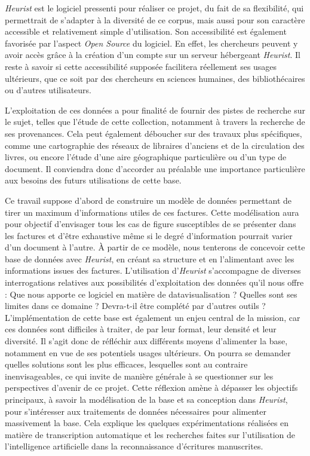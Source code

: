 \documentclass[12pt,twoside]{book}
\begin{document}
\emph{Heurist} est le logiciel pressenti pour réaliser ce projet, du fait de sa flexibilité, qui permettrait de s'adapter à la diversité de ce corpus, mais aussi pour son caractère accessible et relativement simple d'utilisation. 
Son accessibilité est également favorisée par l'aspect \emph{Open Source} du logiciel. En effet, les chercheurs peuvent y avoir accès grâce à la création d'un compte sur un serveur hébergeant \emph{Heurist}. Il reste à savoir si cette accessibilité supposée facilitera réellement ses usages ultérieurs, que ce soit par des chercheurs en sciences humaines, des bibliothécaires ou d'autres utilisateurs. 

L'exploitation de ces données a pour finalité de fournir des pistes de recherche sur le sujet, telles que l'étude de cette collection, notamment à travers la recherche de ses provenances. Cela peut également déboucher sur des travaux plus spécifiques, comme une cartographie des réseaux de libraires d'anciens et de la circulation des livres, ou encore l'étude d'une aire géographique particulière ou d'un type de document. Il conviendra donc d'accorder au préalable une importance particulière aux besoins des futurs utilisations de cette base. 


Ce travail suppose d'abord de construire un modèle de données permettant de tirer un maximum d'informations utiles de ces factures. Cette modélisation aura pour objectif d'envisager tous les cas de figure susceptibles de se présenter dans les factures et d'être exhaustive même si le degré d'information pourrait varier d'un document à l'autre. À partir de ce modèle, nous tenterons de concevoir cette base de données avec \emph{Heurist}, en créant sa structure et en l'alimentant avec les informations issues des factures. L'utilisation d'\emph{Heurist} s'accompagne de diverses interrogations relatives aux possibilités d'exploitation des données qu'il nous offre : Que nous apporte ce logiciel en matière de datavisualisation ? Quelles sont ses limites dans ce domaine ? Devra-t-il être complété par d'autres outils ? L'implémentation de cette base est également un enjeu central de la mission, car ces données sont difficiles à traiter, de par leur format, leur densité et leur diversité. Il s'agit donc de réfléchir aux différents moyens d'alimenter la base, notamment en vue de ses potentiels usages ultérieurs. On pourra se demander quelles solutions sont les plus efficaces, lesquelles sont au contraire inenvisageables, ce qui invite de manière générale à se questionner sur les perspectives d'avenir de ce projet. 
Cette réflexion amène à dépasser les objectifs principaux, à savoir la modélisation de la base et sa conception dans \emph{Heurist}, pour s'intéresser aux traitements de données nécessaires pour alimenter massivement la base. Cela explique les quelques expérimentations réalisées en matière de transcription automatique et les recherches faites sur l'utilisation de l'intelligence artificielle dans la reconnaissance d'écritures manuscrites. 
\end{document}
